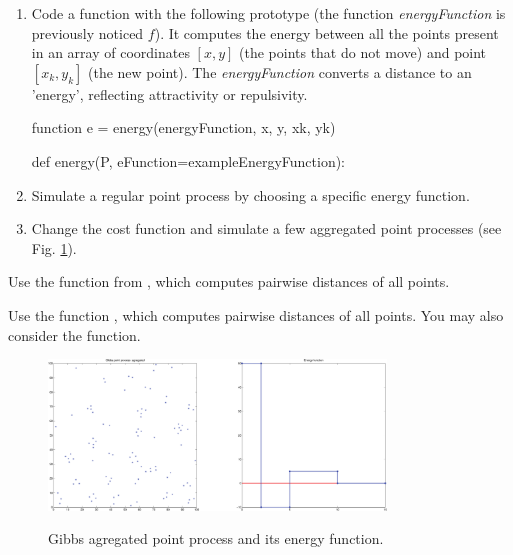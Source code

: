 %
\begin{qbox}
\begin{enumerate}
        \item Code a function with the following prototype (the function \textit{energyFunction} is previously noticed $f$). It computes the energy between all the points present in an array of coordinates $[x, y]$ (the points that do not move) and point $[x_k,y_k]$ (the new point). The \textit{energyFunction} converts a distance to an 'energy', reflecting attractivity or repulsivity.
	\begin{mcomment}
\begin{matlab}
function e = energy(energyFunction, x, y, xk, yk)
\end{matlab}
\end{mcomment}

\begin{pcomment}
\begin{python}
def energy(P, eFunction=exampleEnergyFunction):
\end{python}
\end{pcomment}


	\item Simulate a regular point process by choosing a specific energy function.
	\item Change the cost function and simulate a few aggregated point processes (see Fig. \ref{fig:gibbsprocess}).
\end{enumerate}
\end{qbox}

\begin{pcomment}
 \begin{phelp}
Use the function  from , which computes pairwise distances of all points.  
 \end{phelp}
\end{pcomment}

\begin{mcomment}
 \begin{mhelp}
  Use the function , which computes pairwise distances of all points. You may also consider the  function.
 \end{mhelp}

\end{mcomment}

\vspace*{-7pt}

\begin{figure}[H]
 \centering\caption{Gibbs agregated point process and its energy function.}%
 \includegraphics[width=0.8\textwidth]{../matlab/gibbsprocess-crop.pdf}%
 \label{fig:gibbsprocess}%
\end{figure}

